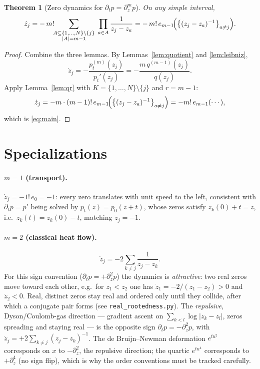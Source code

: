 \documentclass[11pt]{article}
\theoremstyle{plain}
\newtheorem{theorem}{Theorem}
\theoremstyle{definition}
\newcommand{\dt}{\partial_t}
\newcommand{\dz}{\partial_z}
\newcommand{\abs}[1]{\lvert #1\rvert}
\begin{document}
\begin{theorem}[Zero dynamics for $\dt p=\dz^m p$]\label{thm:main}
On any simple interval,
\begin{equation}\label{eq:main}
  \dot z_j
   = -\,m!\!\!\sum_{\substack{A\subseteq\{1,\dots,N\}\setminus\{j\}\\ |A|=m-1}}
       \;\prod_{a\in A}\frac{1}{z_j-z_a}
   = -\,m!\,e_{m-1}\!\Bigl(\bigl\{(z_j-z_a)^{-1}\bigr\}_{a\neq j}\Bigr).
\end{equation}
\end{theorem}

\begin{proof}
Combine the three lemmas. By Lemmas~\ref{lem:quotient} and \ref{lem:leibniz},
\[
  \dot z_j=-\frac{p_t^{(m)}(z_j)}{p_t'(z_j)}
          =-\frac{m\,q^{(m-1)}(z_j)}{q(z_j)} .
\]
Apply Lemma~\ref{lem:qr} with $K=\{1,\dots,N\}\setminus\{j\}$ and $r=m-1$:
\[
  \dot z_j=-m\cdot(m-1)!\,e_{m-1}\!\Bigl(\bigl\{(z_j-z_a)^{-1}\bigr\}_{a\neq j}\Bigr)
          =-m!\,e_{m-1}(\cdots),
\]
which is \eqref{eq:main}.
\end{proof}

\section{Specializations}

\paragraph{$m=1$ (transport).} $\dot z_j=-1!\,e_0=-1$: every zero translates
with unit speed to the left, consistent with $\dt p=p'$ being solved by
$p_t(z)=p_0(z+t)$, whose zeros satisfy $z_k(0)+t=z$, i.e.\ $z_k(t)=z_k(0)-t$,
matching $\dot z_j=-1$.

\paragraph{$m=2$ (classical heat flow).}
\begin{equation}\label{eq:m2}
  \dot z_j=-2\sum_{k\neq j}\frac{1}{z_j-z_k}.
\end{equation}
For this sign convention ($\dt p=+\dz^2 p$) the dynamics is
\emph{attractive}: two real zeros move toward each other, e.g.\ for
$z_1<z_2$ one has $\dot z_1=-2/(z_1-z_2)>0$ and $\dot z_2<0$. Real, distinct
zeros stay real and ordered only until they collide, after which a conjugate
pair forms (see \texttt{real\_rootedness.py}). The \emph{repulsive},
Dyson/Coulomb-gas direction --- gradient ascent on $\sum_{k<l}\log\abs{z_k-z_l}$,
zeros spreading and staying real --- is the opposite sign
$\dt p=-\dz^2 p$, with $\dot z_j=+2\sum_{k\neq j}(z_j-z_k)^{-1}$. The
de Bruijn--Newman deformation $e^{tu^2}$ corresponds on $x$ to $-\dz^2$, the
repulsive direction; the quartic $e^{tu^4}$ corresponds to $+\dz^4$
(no sign flip), which is why the order conventions must be tracked carefully.
\end{document}
